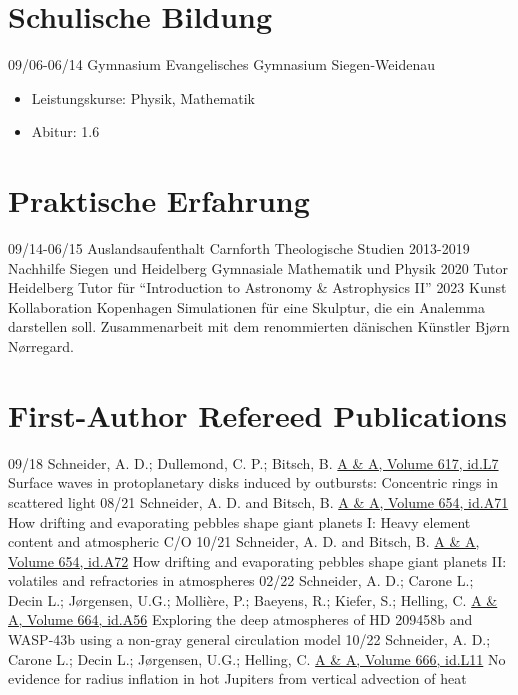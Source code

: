 \documentclass[]{friggeri-cv}
\begin{document}
\section{Schulische Bildung}
\begin{entrylist}
  \entry
    {09/06-06/14}
    {Gymnasium}
    {Evangelisches Gymnasium Siegen-Weidenau}
    {\begin{itemize}\vspace{-3mm}
		\item Leistungskurse: Physik, Mathematik
		\item Abitur: 1.6
	\end{itemize}}
\end{entrylist}
\section{Praktische Erfahrung}
\begin{entrylist}
	\entry
    {09/14-06/15}
    {Auslandsaufenthalt}
    {Carnforth}
    {Theologische Studien}
	\entry
    {2013-2019}
    {Nachhilfe}
    {Siegen und Heidelberg}
    {Gymnasiale Mathematik und Physik}
    \entry
    {2020}
    {Tutor}
    {Heidelberg}
    {Tutor für \enquote{Introduction to Astronomy \& Astrophysics II}}
    \entry
    {2023}
    {Kunst Kollaboration}
    {Kopenhagen}
    {Simulationen für eine Skulptur, die ein Analemma darstellen soll. Zusammenarbeit mit dem renommierten dänischen Künstler Bj{\o}rn N{\o}rregard.}

\end{entrylist}
\newpage
\section{First-Author Refereed Publications}
\begin{entrylist}
  \entry
    {09/18}
    {Schneider, A. D.; Dullemond, C. P.; Bitsch, B.}
    {\href{https://arxiv.org/abs/1809.02834}{A \& A, Volume 617, id.L7}}
    {Surface waves in protoplanetary disks induced by outbursts: Concentric rings in scattered light}
  \entry
    {08/21}
    {Schneider, A. D. and Bitsch, B.}
    {\href{https://arxiv.org/abs/2105.13267}{A \& A, Volume 654, id.A71}}
    {How drifting and evaporating pebbles shape giant planets I: Heavy element content and atmospheric C/O}
  \entry
    {10/21}
    {Schneider, A. D. and Bitsch, B.}
	{\href{https://arxiv.org/abs/2109.03589}{A \& A, Volume 654, id.A72}}
    {How drifting and evaporating pebbles shape giant planets II: volatiles and refractories in atmospheres}
  \entry
    {02/22}
    {Schneider, A. D.; Carone L.; Decin L.; Jørgensen, U.G.; Mollière, P.; Baeyens, R.; Kiefer, S.; Helling, C.}
    {\href{https://arxiv.org/abs/2202.09183}{A \& A, Volume 664, id.A56}}
    {Exploring the deep atmospheres of HD 209458b and WASP-43b using a non-gray general circulation model}    
  \entry
    {10/22}
    {Schneider, A. D.; Carone L.; Decin L.; Jørgensen, U.G.; Helling, C.}
    {\href{https://arxiv.org/abs/2210.01466}{A \& A, Volume 666, id.L11}}
    {No evidence for radius inflation in hot Jupiters from vertical advection of heat}    
\end{entrylist}
\end{document}
